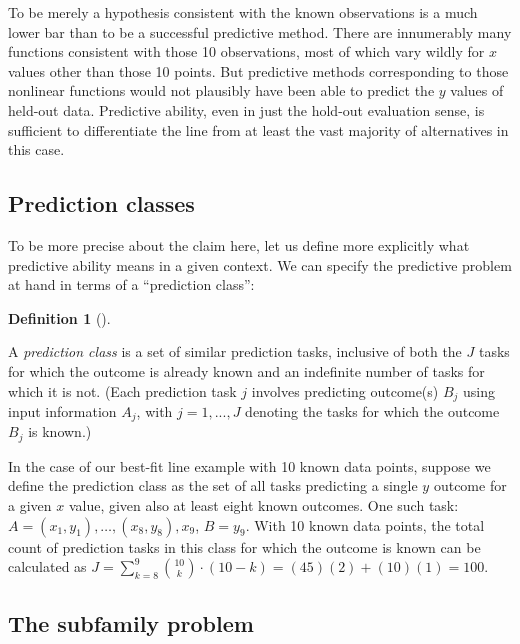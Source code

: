 \documentclass[
  letterpaper,
  DIV=11,
  numbers=noendperiod]{scrartcl}
\theoremstyle{definition}
\newtheorem{definition}{Definition}[section]
\theoremstyle{remark}
\begin{document}
To be merely a hypothesis consistent with the known observations is a
much lower bar than to be a successful predictive method. There are
innumerably many functions consistent with those 10 observations, most
of which vary wildly for \(x\) values other than those 10 points. But
predictive methods corresponding to those nonlinear functions would not
plausibly have been able to predict the \(y\) values of held-out data.
Predictive ability, even in just the hold-out evaluation sense, is
sufficient to differentiate the line from at least the vast majority of
alternatives in this case.

\subsection{Prediction classes}\label{prediction-classes}

To be more precise about the claim here, let us define more explicitly
what predictive ability means in a given context. We can specify the
predictive problem at hand in terms of a ``prediction class'':

\begin{definition}[]\protect\hypertarget{def-class}{}\label{def-class}

A \emph{prediction class} is a set of similar prediction tasks,
inclusive of both the \(J\) tasks for which the outcome is already known
and an indefinite number of tasks for which it is not. (Each prediction
task \(j\) involves predicting outcome(s) \(B_j\) using input
information \(A_j\), with \(j = 1, ..., J\) denoting the tasks for which
the outcome \(B_j\) is known.)

\end{definition}

In the case of our best-fit line example with 10 known data points,
suppose we define the prediction class as the set of all tasks
predicting a single \(y\) outcome for a given \(x\) value, given also at
least eight known outcomes. One such task:
\(A = {(x_1, y_1), \ldots, (x_8, y_8), x_9}\), \(B = {y_9}\). With 10
known data points, the total count of prediction tasks in this class for
which the outcome is known can be calculated as
\(J = \sum_{k=8}^{9} \binom{10}{k} \cdot (10 - k) = (45)(2) + (10)(1) = 100\).

\subsection{The subfamily problem}\label{the-subfamily-problem}
\end{document}
